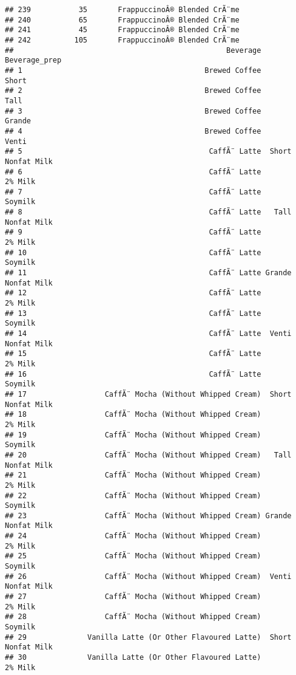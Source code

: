 \documentclass[
]{article}
\begin{document}
\begin{verbatim}
## 239           35       FrappuccinoÂ® Blended CrÃ¨me
## 240           65       FrappuccinoÂ® Blended CrÃ¨me
## 241           45       FrappuccinoÂ® Blended CrÃ¨me
## 242          105       FrappuccinoÂ® Blended CrÃ¨me
##                                                 Beverage      Beverage_prep
## 1                                          Brewed Coffee              Short
## 2                                          Brewed Coffee               Tall
## 3                                          Brewed Coffee             Grande
## 4                                          Brewed Coffee              Venti
## 5                                           CaffÃ¨ Latte  Short Nonfat Milk
## 6                                           CaffÃ¨ Latte            2% Milk
## 7                                           CaffÃ¨ Latte            Soymilk
## 8                                           CaffÃ¨ Latte   Tall Nonfat Milk
## 9                                           CaffÃ¨ Latte            2% Milk
## 10                                          CaffÃ¨ Latte            Soymilk
## 11                                          CaffÃ¨ Latte Grande Nonfat Milk
## 12                                          CaffÃ¨ Latte            2% Milk
## 13                                          CaffÃ¨ Latte            Soymilk
## 14                                          CaffÃ¨ Latte  Venti Nonfat Milk
## 15                                          CaffÃ¨ Latte            2% Milk
## 16                                          CaffÃ¨ Latte            Soymilk
## 17                  CaffÃ¨ Mocha (Without Whipped Cream)  Short Nonfat Milk
## 18                  CaffÃ¨ Mocha (Without Whipped Cream)            2% Milk
## 19                  CaffÃ¨ Mocha (Without Whipped Cream)            Soymilk
## 20                  CaffÃ¨ Mocha (Without Whipped Cream)   Tall Nonfat Milk
## 21                  CaffÃ¨ Mocha (Without Whipped Cream)            2% Milk
## 22                  CaffÃ¨ Mocha (Without Whipped Cream)            Soymilk
## 23                  CaffÃ¨ Mocha (Without Whipped Cream) Grande Nonfat Milk
## 24                  CaffÃ¨ Mocha (Without Whipped Cream)            2% Milk
## 25                  CaffÃ¨ Mocha (Without Whipped Cream)            Soymilk
## 26                  CaffÃ¨ Mocha (Without Whipped Cream)  Venti Nonfat Milk
## 27                  CaffÃ¨ Mocha (Without Whipped Cream)            2% Milk
## 28                  CaffÃ¨ Mocha (Without Whipped Cream)            Soymilk
## 29              Vanilla Latte (Or Other Flavoured Latte)  Short Nonfat Milk
## 30              Vanilla Latte (Or Other Flavoured Latte)            2% Milk

\end{verbatim}
\end{document}
